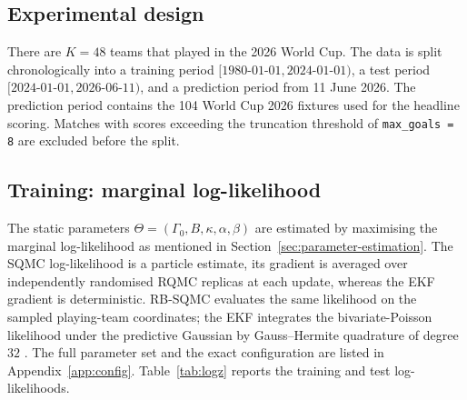
\subsection{Experimental design}

There are $K=48$ teams that played in the 2026 World Cup. The data is split chronologically into a training period $[1980\text{-}01\text{-}01, 2024\text{-}01\text{-}01)$, a test period $[2024\text{-}01\text{-}01, 2026\text{-}06\text{-}11)$, and a prediction period from 11 June 2026. The prediction period contains the 104 World Cup 2026 fixtures used for the headline scoring. Matches with scores exceeding the truncation threshold of \texttt{max\_goals = 8} are excluded before the split.

\subsection{Training: marginal log-likelihood}

The static parameters $\Theta = (\Gamma_0, B, \kappa, \alpha, \beta)$ are estimated by maximising the marginal log-likelihood as mentioned in Section~\ref{sec:parameter-estimation}. The SQMC log-likelihood is a particle estimate, its gradient is averaged over independently randomised RQMC replicas at each update, whereas the EKF gradient is deterministic. RB-SQMC evaluates the same likelihood on the sampled playing-team coordinates; the EKF integrates the bivariate-Poisson likelihood under the predictive Gaussian by Gauss--Hermite quadrature of degree $32$ \citep{ghq}. The full parameter set and the exact configuration are listed in Appendix~\ref{app:config}. Table~\ref{tab:logz} reports the training and test log-likelihoods.


